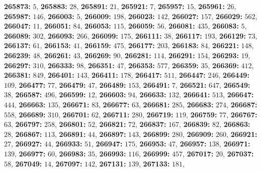 \textsf{\bfseries 265873:} $5$, \textsf{\bfseries 265883:} $28$, \textsf{\bfseries 265891:} $21$, \textsf{\bfseries 265921:} $7$, \textsf{\bfseries 265957:} $15$, \textsf{\bfseries 265961:} $26$, \textsf{\bfseries 265987:} $146$, \textsf{\bfseries 266003:} $5$, \textsf{\bfseries 266009:} $198$, \textsf{\bfseries 266023:} $142$, \textsf{\bfseries 266027:} $157$, \textsf{\bfseries 266029:} $562$, \textsf{\bfseries 266047:} $11$, \textsf{\bfseries 266051:} $84$, \textsf{\bfseries 266053:} $115$, \textsf{\bfseries 266059:} $56$, \textsf{\bfseries 266081:} $435$, \textsf{\bfseries 266083:} $5$, \textsf{\bfseries 266089:} $302$, \textsf{\bfseries 266093:} $266$, \textsf{\bfseries 266099:} $175$, \textsf{\bfseries 266111:} $38$, \textsf{\bfseries 266117:} $193$, \textsf{\bfseries 266129:} $73$, \textsf{\bfseries 266137:} $61$, \textsf{\bfseries 266153:} $41$, \textsf{\bfseries 266159:} $475$, \textsf{\bfseries 266177:} $203$, \textsf{\bfseries 266183:} $84$, \textsf{\bfseries 266221:} $148$, \textsf{\bfseries 266239:} $48$, \textsf{\bfseries 266261:} $43$, \textsf{\bfseries 266269:} $90$, \textsf{\bfseries 266281:} $114$, \textsf{\bfseries 266291:} $154$, \textsf{\bfseries 266293:} $19$, \textsf{\bfseries 266297:} $310$, \textsf{\bfseries 266333:} $98$, \textsf{\bfseries 266351:} $47$, \textsf{\bfseries 266353:} $577$, \textsf{\bfseries 266359:} $35$, \textsf{\bfseries 266369:} $412$, \textsf{\bfseries 266381:} $849$, \textsf{\bfseries 266401:} $143$, \textsf{\bfseries 266411:} $178$, \textsf{\bfseries 266417:} $511$, \textsf{\bfseries 266447:} $246$, \textsf{\bfseries 266449:} $109$, \textsf{\bfseries 266477:} $77$, \textsf{\bfseries 266479:} $47$, \textsf{\bfseries 266489:} $153$, \textsf{\bfseries 266491:} $7$, \textsf{\bfseries 266521:} $647$, \textsf{\bfseries 266549:} $38$, \textsf{\bfseries 266587:} $496$, \textsf{\bfseries 266599:} $12$, \textsf{\bfseries 266603:} $94$, \textsf{\bfseries 266633:} $132$, \textsf{\bfseries 266641:} $513$, \textsf{\bfseries 266647:} $444$, \textsf{\bfseries 266663:} $135$, \textsf{\bfseries 266671:} $83$, \textsf{\bfseries 266677:} $63$, \textsf{\bfseries 266681:} $285$, \textsf{\bfseries 266683:} $274$, \textsf{\bfseries 266687:} $558$, \textsf{\bfseries 266689:} $310$, \textsf{\bfseries 266701:} $62$, \textsf{\bfseries 266711:} $280$, \textsf{\bfseries 266719:} $119$, \textsf{\bfseries 266759:} $77$, \textsf{\bfseries 266767:} $63$, \textsf{\bfseries 266797:} $258$, \textsf{\bfseries 266801:} $52$, \textsf{\bfseries 266821:} $72$, \textsf{\bfseries 266837:} $167$, \textsf{\bfseries 266839:} $82$, \textsf{\bfseries 266863:} $28$, \textsf{\bfseries 266867:} $113$, \textsf{\bfseries 266891:} $44$, \textsf{\bfseries 266897:} $143$, \textsf{\bfseries 266899:} $280$, \textsf{\bfseries 266909:} $260$, \textsf{\bfseries 266921:} $27$, \textsf{\bfseries 266927:} $44$, \textsf{\bfseries 266933:} $51$, \textsf{\bfseries 266947:} $175$, \textsf{\bfseries 266953:} $47$, \textsf{\bfseries 266957:} $138$, \textsf{\bfseries 266971:} $139$, \textsf{\bfseries 266977:} $60$, \textsf{\bfseries 266983:} $35$, \textsf{\bfseries 266993:} $116$, \textsf{\bfseries 266999:} $457$, \textsf{\bfseries 267017:} $20$, \textsf{\bfseries 267037:} $58$, \textsf{\bfseries 267049:} $14$, \textsf{\bfseries 267097:} $142$, \textsf{\bfseries 267131:} $139$, \textsf{\bfseries 267133:} $181$, 
